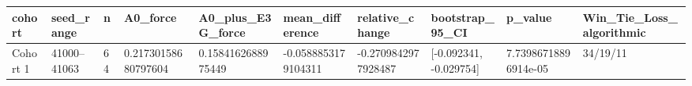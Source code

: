 \begin{tabular}{llllllllll}
\toprule
cohort & seed\_range & n & A0\_force & A0\_plus\_E3G\_force & mean\_difference & relative\_change & bootstrap\_95\_CI & p\_value & Win\_Tie\_Loss\_algorithmic \\
\midrule
Cohort 1 & 41000–41063 & 64 & 0.21730158680797604 & 0.1584162688975449 & -0.0588853179104311 & -0.2709842977928487 & [-0.092341, -0.029754] & 7.73986718896914e-05 & 34/19/11 \\
\bottomrule
\end{tabular}

